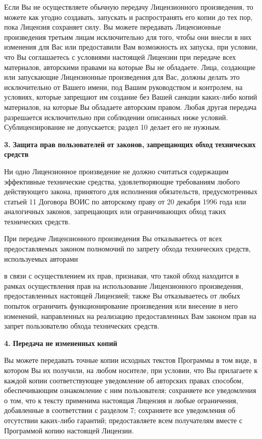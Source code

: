 Если Вы не осуществляете обычную передачу Лицензионного произведения, то можете как угодно создавать, запускать и распространять его копии до тех пор, пока Лицензия сохраняет силу. Вы можете передавать Лицензионные произведения третьим лицам исключительно для того, чтобы они внесли в них изменения для Вас или предоставили Вам возможность их запуска, при условии, что Вы соглашаетесь с условиями настоящей Лицензии при передаче всех материалов, авторскими правами на которые Вы не обладаете. Лица, создающие или запускающие Лицензионные произведения для Вас, должны делать это исключительно от Вашего имени, под Вашим руководством и контролем, на условиях, которые запрещают им создание без Вашей санкции каких-\/либо копий материалов, на которые Вы обладаете авторским правом. Любая другая передача разрешается исключительно при соблюдении описанных ниже условий. Сублицензирование не допускается; раздел 10 делает его не нужным.

{\bfseries{3.}} {\bfseries{Защита}} {\bfseries{прав}} {\bfseries{пользователей}} {\bfseries{от}} {\bfseries{законов,}} {\bfseries{запрещающих}} {\bfseries{обход}} {\bfseries{технических}} {\bfseries{средств}}

Ни одно Лицензионное произведение не должно считаться содержащим эффективные технические средства, удовлетворяющие требованиям любого действующего закона, принятого для исполнения обязательств, предусмотренных статьей 11 Договора ВОИС по авторскому праву от 20 декабря 1996 года или аналогичных законов, запрещающих или ограничивающих обход таких технических средств.

При передаче Лицензионного произведения Вы отказываетесь от всех предоставляемых законом полномочий по запрету обхода технических средств, используемых авторами

в связи с осуществлением их прав, признавая, что такой обход находится в рамках осуществления прав на использование Лицензионного произведения, предоставленных настоящей Лицензией; также Вы отказываетесь от любых попыток ограничить функционирование произведения или внесение в него изменений, направленных на реализацию предоставленных Вам законом прав на запрет пользователю обхода технических средств.

{\bfseries{4.}} {\bfseries{Передача}} {\bfseries{не}} {\bfseries{измененных}} {\bfseries{копий}}

Вы можете передавать точные копии исходных текстов Программы в том виде, в котором Вы их получили, на любом носителе, при условии, что Вы прилагаете к каждой копии соответствующее уведомление об авторских правах способом, обеспечивающим ознакомление с ним пользователя; сохраняете все уведомления о том, что к тексту применима настоящая Лицензия и любые ограничения, добавленные в соответствии с разделом 7; сохраняете все уведомления об отсутствии каких-\/либо гарантий; предоставляете всем получателям вместе с Программой копию настоящей Лицензии.

